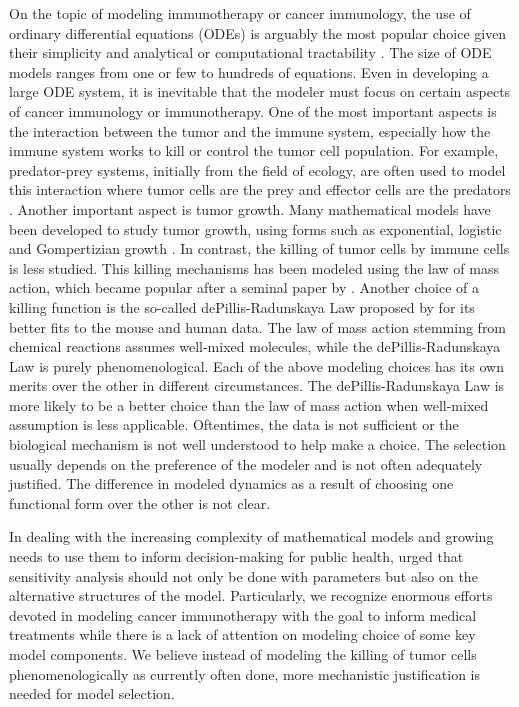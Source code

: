 \documentclass[review,authoryear]{elsarticle}
\begin{document}
On the topic of modeling immunotherapy or cancer immunology, the use of ordinary differential equations (ODEs) is arguably the most popular choice
given their simplicity and analytical or computational tractability
\citep{Eftimie2010}. The size of ODE models ranges from one or few
to hundreds of equations. Even in developing a large
ODE system, it is inevitable that the modeler must focus on certain
aspects of cancer immunology or immunotherapy. One of the most important
aspects is the interaction between the tumor and the immune system, especially
how the immune system works to kill or control the tumor cell population. For example, predator-prey
systems, initially from the field of ecology, are often used to model this interaction where tumor cells
are the prey and effector cells are the predators \citep{Hamilton2022}. Another important aspect is tumor growth. Many mathematical
models have been developed to study tumor growth, using forms such as exponential, logistic and Gompertizian
growth \citep{Murphy2016}. In contrast, the killing of tumor cells
by immune cells is less studied. This killing mechanisms has been modeled using
the law of mass action, which became popular after a seminal paper by \citet{KUZNETSOV1994}.
Another choice of a killing function is the so-called dePillis-Radunskaya
Law proposed by \citet{Pillis2005} for its better fits to the mouse and human data. The law of mass action stemming from chemical reactions assumes well-mixed molecules, while the dePillis-Radunskaya
Law is purely phenomenological. Each of the above modeling choices has its own merits over the other in different circumstances. The dePillis-Radunskaya Law is more likely to be a
better choice than the law of mass action when well-mixed
assumption is less applicable. Oftentimes, the data is not sufficient or the biological mechanism is not well understood to help make a choice. The selection usually depends on the preference
of the modeler and is not often adequately justified. The difference in modeled dynamics
as a result of choosing one functional form over the other is not
clear. 

In dealing with the increasing complexity of mathematical models and growing
needs to use them to inform decision-making for public health, \citet{Basu2013} urged that sensitivity analysis should
not only be done with parameters but also on the alternative structures
of the model. Particularly, we recognize enormous efforts devoted
in modeling cancer immunotherapy with the goal to inform medical treatments
while there is a lack of attention on modeling choice of some key
model components. We believe instead of modeling the killing of tumor cells phenomenologically as currently often done, more mechanistic justification
is needed for model selection.
\end{document}
